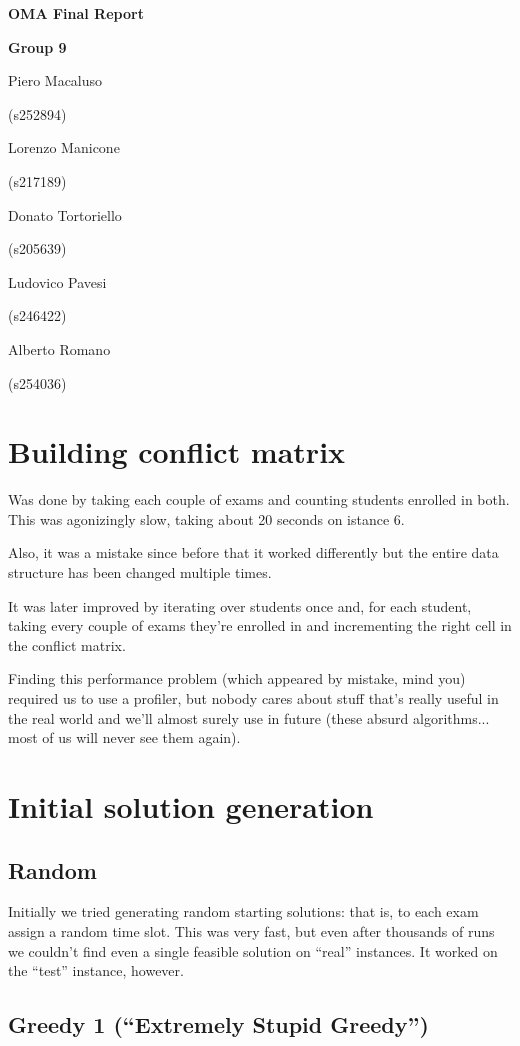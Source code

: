 \documentclass[11pt, a4paper, leqno]{article}
\newcommand{\nome}[2]{
\begin{minipage}[t]{0.185\linewidth}
	\centering #1\par
	\centering\small (#2)\par
\end{minipage}
}
\begin{document}
	
	\begin{center}
		{\huge\textbf{OMA Final Report}}\par
		\vspace{0.3em}
		{\large\textbf{Group 9}}\par
		\vspace{1em}
		\nome{Piero Macaluso}{s252894}
		\nome{Lorenzo Manicone}{s217189}
		\nome{Donato Tortoriello}{s205639}
		\nome{Ludovico Pavesi}{s246422}
		\nome{Alberto Romano}{s254036} %
	\end{center}

	\section{Building conflict matrix}
	
	Was done by taking each couple of exams and counting students enrolled in both. This was agonizingly slow, taking about 20 seconds on istance 6.
	
	Also, it was a mistake since before that it worked differently but the entire data structure has been changed multiple times.
	
	It was later improved by iterating over students once and, for each student, taking every couple of exams they're enrolled in and incrementing the right cell in the conflict matrix.
	
	Finding this performance problem (which appeared by mistake, mind you) required us to use a profiler, but nobody cares about stuff that's really useful in the real world and we'll almost surely use in future (these absurd algorithms... most of us will never see them again).

	\section{Initial solution generation}
	
	\subsection{Random}
	
	Initially we tried generating random starting solutions: that is, to each exam assign a random time slot. This was very fast, but even after thousands of runs we couldn't find even a single feasible solution on ``real'' instances. It worked on the ``test'' instance, however.
	
	\subsection{Greedy 1 (``Extremely Stupid Greedy'')}
	
\end{document}
